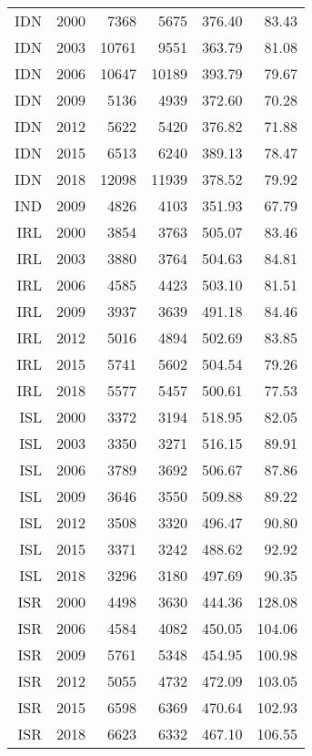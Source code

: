 \begin{longtable}{|r|r|r|r|r|r|}
    IDN   & 2000  & 7368  & 5675  & 376.40 & 83.43 \\
    IDN   & 2003  & 10761 & 9551  & 363.79 & 81.08 \\
    IDN   & 2006  & 10647 & 10189 & 393.79 & 79.67 \\
    IDN   & 2009  & 5136  & 4939  & 372.60 & 70.28 \\
    IDN   & 2012  & 5622  & 5420  & 376.82 & 71.88 \\
    IDN   & 2015  & 6513  & 6240  & 389.13 & 78.47 \\
    IDN   & 2018  & 12098 & 11939 & 378.52 & 79.92 \\
    IND   & 2009  & 4826  & 4103  & 351.93 & 67.79 \\
    IRL   & 2000  & 3854  & 3763  & 505.07 & 83.46 \\
    IRL   & 2003  & 3880  & 3764  & 504.63 & 84.81 \\
    IRL   & 2006  & 4585  & 4423  & 503.10 & 81.51 \\
    IRL   & 2009  & 3937  & 3639  & 491.18 & 84.46 \\
    IRL   & 2012  & 5016  & 4894  & 502.69 & 83.85 \\
    IRL   & 2015  & 5741  & 5602  & 504.54 & 79.26 \\
    IRL   & 2018  & 5577  & 5457  & 500.61 & 77.53 \\
    ISL   & 2000  & 3372  & 3194  & 518.95 & 82.05 \\
    ISL   & 2003  & 3350  & 3271  & 516.15 & 89.91 \\
    ISL   & 2006  & 3789  & 3692  & 506.67 & 87.86 \\
    ISL   & 2009  & 3646  & 3550  & 509.88 & 89.22 \\
    ISL   & 2012  & 3508  & 3320  & 496.47 & 90.80 \\
    ISL   & 2015  & 3371  & 3242  & 488.62 & 92.92 \\
    ISL   & 2018  & 3296  & 3180  & 497.69 & 90.35 \\
    ISR   & 2000  & 4498  & 3630  & 444.36 & 128.08 \\
    ISR   & 2006  & 4584  & 4082  & 450.05 & 104.06 \\
    ISR   & 2009  & 5761  & 5348  & 454.95 & 100.98 \\
    ISR   & 2012  & 5055  & 4732  & 472.09 & 103.05 \\
    ISR   & 2015  & 6598  & 6369  & 470.64 & 102.93 \\
    ISR   & 2018  & 6623  & 6332  & 467.10 & 106.55 \\

\end{longtable}
